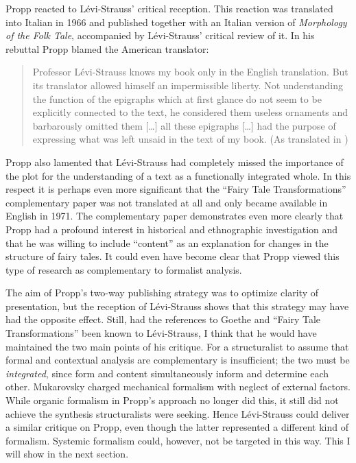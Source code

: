 \documentclass[output=paper]{langscibook}
\begin{document}
Propp reacted to Lévi-Strauss' critical reception. This reaction was translated into Italian in 1966 and published together with an Italian version of \emph{Morphology of the Folk Tale}, accompanied by Lévi-Strauss' critical review of it. In his rebuttal Propp blamed the American translator:

\begin{quotation}
Professor Lévi-Strauss knows my book only in the English translation. But its translator allowed himself an impermissible liberty. Not understanding the function of the epigraphs which at first glance do not seem to be explicitly connected to the text, he considered them useless ornaments and barbarously omitted them […] all these epigraphs […] had the purpose of expressing what was left unsaid in the text of my book. (As translated in \citealt[81]{Steiner1984})
\end{quotation}

Propp also lamented that Lévi-Strauss had completely missed the importance of the plot for the understanding of a text as a functionally integrated whole. In this respect it is perhaps even more significant that the ``Fairy Tale Transformations'' complementary paper was not translated at all and only became available in English in 1971. The complementary paper demonstrates even more clearly that Propp had a profound interest in historical and ethnographic investigation and that he was willing to include ``content'' as an explanation for changes in the structure of fairy tales. It could even have become clear that Propp viewed this type of research as complementary to formalist analysis.

The aim of Propp's two-way publishing strategy was to optimize clarity of presentation, but the reception of Lévi-Strauss shows that this strategy may have had the opposite effect. Still, had the references to Goethe and ``Fairy Tale Transformations'' been known to Lévi-Strauss, I think that he would have maintained the two main points of his critique. For a structuralist to assume that formal and contextual analysis are complementary is insufficient; the two must be \emph{integrated}, since form and content simultaneously inform and determine each other. Mukarovsky charged mechanical formalism with neglect of external factors. While organic formalism in Propp's approach no longer did this, it still did not achieve the synthesis structuralists were seeking. Hence Lévi-Strauss could deliver a similar critique on Propp, even though the latter represented a different kind of formalism. Systemic formalism could, however, not be targeted in this way. This I will show in the next section.
\end{document}
